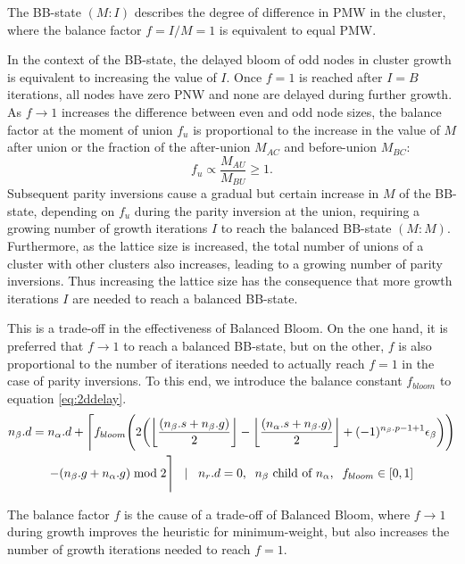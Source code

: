 \begin{lemma}\label{lem:bbstate}
  The BB-state $(M:I)$ describes the degree of difference in PMW in the cluster, where the balance factor $f=I/M=1$ is equivalent to equal PMW. 
\end{lemma}
In the context of the BB-state, the delayed bloom of odd nodes in cluster growth is equivalent to increasing the value of $I$. Once $f=1$ is reached after $I=B$ iterations, all nodes have zero PNW and none are delayed during further growth. As $f\to1$ increases the difference between even and odd node sizes, the balance factor at the moment of union $f_u$ is proportional to the increase in the value of $M$ after union or the fraction of the after-union $M_{AC}$ and before-union $M_{BC}$:
\begin{equation}\label{eq:bbpropto}
  f_u \propto \frac{M_{AU}}{M_{BU}} \geq 1.
\end{equation}
Subsequent parity inversions cause a gradual but certain increase in $M$ of the BB-state, depending on $f_u$ during the parity inversion at the union, requiring a growing number of growth iterations $I$ to reach the balanced BB-state $(M:M)$. Furthermore, as the lattice size is increased, the total number of unions of a cluster with other clusters also increases, leading to a growing number of parity inversions. Thus increasing the lattice size has the consequence that more growth iterations $I$ are needed to reach a balanced BB-state.

This is a trade-off in the effectiveness of Balanced Bloom. On the one hand, it is preferred that $f\to1$ to reach a balanced BB-state, but on the other, $f$ is also proportional to the number of iterations needed to actually reach $f=1$ in the case of parity inversions. To this end, we introduce the balance constant $f_{bloom}$ to equation \ref{eq:2ddelay}.
\begin{multline}\label{eq:delayequation}
  n_\beta.d = n_\alpha.d + \Bigg \lceil f_{bloom} \Bigg( 2\bigg({\left \lfloor \frac{(n_\beta.s+n_\beta.g)}{2} \right \rfloor } - {\left \lfloor \frac{(n_\alpha.s+n_\beta.g)}{2} \right \rfloor } + (-1)^{n_\beta.p-1+1}\epsilon_\beta\bigg)
   \Bigg) \\ - (n_\beta.g + n_\alpha.g)\bmod 2 \Bigg \rceil \hspace{.3cm} | \hspace{.3cm} n_r.d = 0, \hspace{.2cm} n_\beta \mbox{ child of } n_\alpha, \hspace{.2cm} f_{bloom} \in [0, 1]
\end{multline}
\begin{lemma}\label{lem:tradeoff}
  The balance factor $f$ is the cause of a trade-off of Balanced Bloom, where $f\to1$ during growth improves the heuristic for minimum-weight, but also increases the number of growth iterations needed to reach $f=1$. 
\end{lemma}

